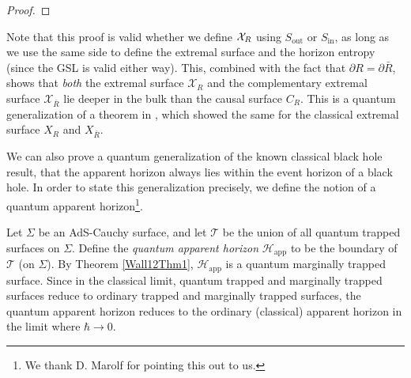 \documentclass[12pt]{article}
\theoremstyle{remark}
\numberwithin{equation}{section}
\numberwithin{equation}{section}
\begin{document}
\begin{proof}

\end{proof}

Note that this proof is valid whether we define ${\cal X}_R$ using $S_\mathrm{out}$ or $S_\mathrm{in}$, as long as we use the same side to define the extremal surface and the horizon entropy (since the GSL is valid either way). This, combined with the fact that $\partial R=\partial\bar{R}$, shows that \textit{both} the extremal surface $\mathcal{X}_{R}$ and the complementary extremal surface $\mathcal{X}_{\bar{R}}$ lie deeper in the bulk than the causal surface $C_{R}$. This is a quantum generalization of a theorem in \cite{WallMaximin}, which showed the same for the classical extremal surface $X_{R}$ and $X_{\bar{R}}$.

We can also prove a quantum generalization of the known classical black hole result, that the apparent horizon always lies within the event horizon of a black hole. In order to state this generalization precisely, we define the notion of a quantum apparent horizon\footnote{We thank D. Marolf for pointing this out to us.}.

Let $\Sigma$ be an AdS-Cauchy surface, and let $\mathcal{T}$ be the union of all quantum trapped surfaces on $\Sigma$. Define the \emph{quantum apparent horizon} $\mathcal{H}_{\mathrm{app}}$ to be the boundary of $\mathcal{T}$ (on $\Sigma$).  By Theorem \ref{Wall12Thm1}, $\mathcal{H}_{\text{app}}$ is a quantum marginally trapped surface.  Since in the classical limit, quantum trapped and marginally trapped surfaces reduce to ordinary trapped and marginally trapped surfaces, the quantum apparent horizon reduces to the ordinary (classical) apparent horizon in the limit where $\hbar \rightarrow 0$.
\end{document}
